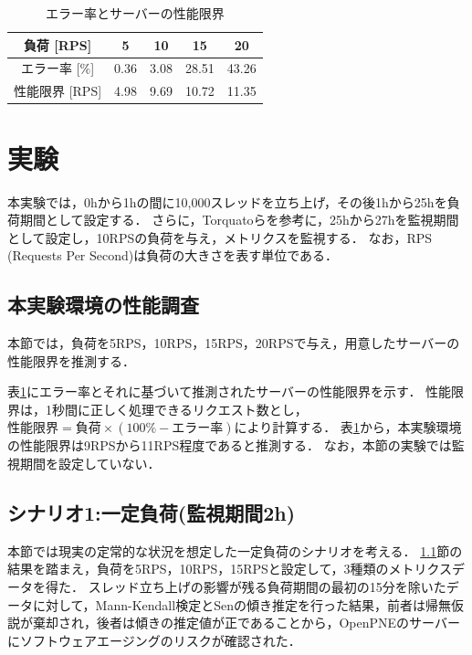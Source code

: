 \documentclass[twoside,twocolumn,10pt]{jarticle}  %
\begin{document}
\begin{table}[t]
  \vspace{-0.3cm}
  \centering
  \caption{エラー率とサーバーの性能限界}
  \label{tab:rps}
  \begin{tabular}{ccccc}
    \hline \hline
    負荷 [RPS] & 5 & 10 & 15 & 20 \\ \hline %
    エラー率 [\%] & 0.36 & 3.08 & 28.51 & 43.26 \\ \hline
    性能限界 [RPS] & 4.98 & 9.69 & 10.72 & 11.35 \\ \hline
  \end{tabular}
  \vspace{-0.4cm}
\end{table}

\section{実験}
本実験では，0hから1hの間に10,000スレッドを立ち上げ，その後1hから25hを負荷期間として設定する．
さらに，Torquatoら\cite{Torquato2018SWAREa}を参考に，25hから27hを監視期間として設定し，10RPSの負荷を与え，メトリクスを監視する．
なお，RPS (Requests Per Second)は負荷の大きさを表す単位である．

\subsection{本実験環境の性能調査}
\label{subsec:limit}
本節では，負荷を5RPS，10RPS，15RPS，20RPSで与え，用意したサーバーの性能限界を推測する．

表\ref{tab:rps}にエラー率とそれに基づいて推測されたサーバーの性能限界を示す．
性能限界は，1秒間に正しく処理できるリクエスト数とし，$性能限界=負荷\times(100\%-エラー率)$により計算する．
表\ref{tab:rps}から，本実験環境の性能限界は9RPSから11RPS程度であると推測する．
なお，本節の実験では監視期間を設定していない．

\subsection{シナリオ1:一定負荷(監視期間2h)}\label{subsec:load1}

本節では現実の定常的な状況を想定した一定負荷のシナリオを考える．
\ref{subsec:limit}節の結果を踏まえ，負荷を5RPS，10RPS，15RPSと設定して，3種類のメトリクスデータを得た．
スレッド立ち上げの影響が残る負荷期間の最初の15分を除いたデータに対して，Mann-Kendall検定\cite{Mann1945Nonparametric}とSenの傾き推定\cite{Sen1968Estimates}を行った結果，前者は帰無仮説が棄却され，後者は傾きの推定値が正であることから，OpenPNEのサーバーにソフトウェアエージングのリスクが確認された．
\end{document}
